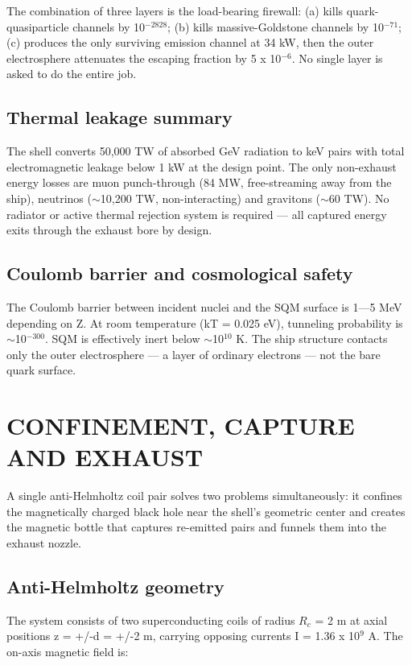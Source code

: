 \documentclass[12pt,a4paper]{article}
\begin{document}
The combination of three layers is the load-bearing firewall: (a) kills quark-quasiparticle channels by 10$^{-2828}$; (b) kills massive-Goldstone channels by 10$^{-71}$; (c) produces the only surviving emission channel at 34 kW, then the outer electrosphere attenuates the escaping fraction by 5 x 10$^{-6}$. No single layer is asked to do the entire job.

\subsection{Thermal leakage summary}
The shell converts 50,000 TW of absorbed GeV radiation to keV pairs with total electromagnetic leakage below 1 kW at the design point. The only non-exhaust energy losses are muon punch-through (84 MW, free-streaming away from the ship), neutrinos ($\sim$10,200 TW, non-interacting) and gravitons ($\sim$60 TW). No radiator or active thermal rejection system is required --- all captured energy exits through the exhaust bore by design.

\subsection{Coulomb barrier and cosmological safety}
The Coulomb barrier between incident nuclei and the SQM surface is 1---5 MeV depending on Z. At room temperature (kT = 0.025 eV), tunneling probability is $\sim$10$^{-300}$. SQM is effectively inert below $\sim$10$^{10}$ K. The ship structure contacts only the outer electrosphere --- a layer of ordinary electrons --- not the bare quark surface.

\section{CONFINEMENT, CAPTURE AND EXHAUST}
A single anti-Helmholtz coil pair solves two problems simultaneously: it confines the magnetically charged black hole near the shell's geometric center and creates the magnetic bottle that captures re-emitted pairs and funnels them into the exhaust nozzle.

\subsection{Anti-Helmholtz geometry}
The system consists of two superconducting coils of radius $R_c$ = 2 m at axial positions z = +/-d = +/-2 m, carrying opposing currents I = 1.36 x 10$^{9}$ A. The on-axis magnetic field is:
\end{document}
